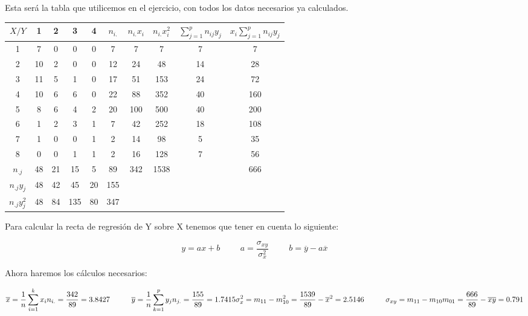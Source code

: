 \subproblem
Esta será la tabla que utilicemos en el ejercicio, con todos los datos necesarios ya calculados.

\begin{table}[ht]
    \begin{tabular}{|c|c|c|c|c|c|c|c|c|c|}
        \hline
         $X/Y$ & 1 & 2 & 3 & 4 & $n_{i.}$ & $n_{i.} x_i$ & $n_{i.} x_i^2$ & $\sum_{j=1}^p n_{ij} y_j$ & $x_i \sum_{j=1}^p n_{ij} y_j$ \\ \hline
         1 & 7 & 0 & 0 & 0 & 7 & 7 & 7 & 7 & 7 \\ \hline 
         2 & 10 & 2 & 0 & 0 & 12 & 24 & 48 & 14 & 28 \\ \hline 
         3 & 11 & 5 & 1 & 0 & 17 & 51 & 153 & 24 & 72 \\ \hline 
         4 & 10 & 6 & 6 & 0 & 22 & 88 & 352 & 40 & 160 \\ \hline 
         5 & 8 & 6 & 4 & 2 & 20 & 100 & 500 & 40 & 200 \\ \hline 
         6 & 1 & 2 & 3 & 1 & 7 & 42 & 252 & 18 & 108 \\ \hline 
         7 & 1 & 0 & 0 & 1 & 2 & 14 & 98 & 5 & 35 \\ \hline
         8 & 0 & 0 & 1 & 1 & 2 & 16 & 128 & 7 & 56 \\ \hline
         $n_{.j}$ & 48 & 21 & 15 & 5 & 89 & 342 & 1538 &  & 666 \\ \hline
         $n_{.j}y_j$ & 48 & 42 & 45 & 20 & 155 &  &  &  &  \\ \hline
         $n_{.j}y_j^2$ & 48 & 84 & 135 & 80 & 347 &  &  &  &  \\ \hline
    \end{tabular}
\end{table}

Para calcular la recta de regresión de Y sobre X tenemos que tener en cuenta lo siguiente:

\begin{equation*}
    y = ax+b
    \hspace{1cm}
    a = \dfrac{\sigma_{xy}}{\sigma_x^2}
    \hspace{1cm}
    b = \overline{y} - a \overline{x}
    \hspace{1cm}
\end{equation*}

Ahora haremos los cálculos necesarios:

\begin{center}
    \begin{equation*}
        \overline{x} = \dfrac{1}{n} \sum_{i=1}^k x_i n_{i.} = \dfrac{342}{89} = 3.8427
        \hspace{1cm}
        \overline{y} = \dfrac{1}{n} \sum_{k=1}^p y_j n_{j.} = \dfrac{155}{89} = 1.7415 \\
        
        \sigma_{x}^2 = m_{11} - m_{10}^2 = \dfrac{1539}{89} - \overline{x}^2 = 2.5146
        \hspace{1cm}
        \sigma_{xy} = m_{11} - m_{10}m_{01} = \dfrac{666}{89} - \overline{x}\overline{y} = 0.791
    \end{equation*}
\end{center}

